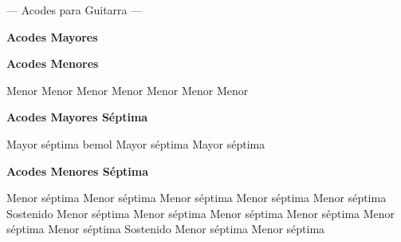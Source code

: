 %

\ifguitarra

\chead{\CHeadFont ({\rm\thepage})}
\rhead{\RHeadFont\RelDate}
{\parindent 8pt
        {\myTitleFont --- Acodes para Guitarra ---}}\par
\vskip 20pt
\textbf{Acodes Mayores}

\small
{}      

      
\normalsize

\textbf{Acodes Menores}

\small
{} Menor  Menor  Menor  Menor  Menor  Menor  Menor

      
\normalsize

\vskip 20pt
\textbf{Acodes Mayores S\'eptima}

 Mayor s\'eptima
 bemol Mayor s\'eptima
 Mayor s\'eptima
\vskip 20pt

\textbf{Acodes Menores S\'eptima}

\small
{} Menor s\'eptima
 Menor s\'eptima
 Menor s\'eptima
 Menor s\'eptima
 Menor s\'eptima
 Sostenido Menor s\'eptima
 Menor s\'eptima
 Menor s\'eptima
 Menor s\'eptima
 Menor s\'eptima
 Menor s\'eptima
 Sostenido Menor s\'eptima
 Menor s\'eptima
\normalsize

